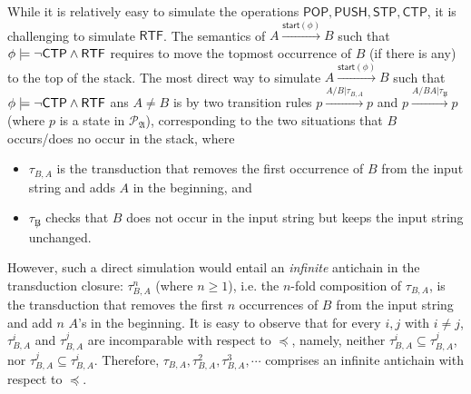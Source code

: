 \documentclass[preprint,12pt]{elsarticle}
\newcommand\Mm{{\mathcal{M} }}
\newcommand\Pp{{\mathcal{P} }}
\newcommand\ctpflag{{\sf CTP}}
\newcommand\rtfflag{{\sf RTF}}
\newcommand\startactivity{{\mathsf{start} }}
\newcommand{\PUSH}{\mathsf{PUSH}}
\newcommand{\CTP}{\mathsf{CTP}}
\newcommand{\RTF}{\mathsf{RTF}}
\newcommand{\POP}{\mathsf{POP}}
\newcommand{\STP}{\mathsf{STP}}
\newcommand\Aut{{\mathfrak{A} }}
\newcommand{\WOTrPDS}{\textsf{WPOTrPDS}}
\begin{document}
While it is relatively easy to simulate the operations $\POP, \PUSH, \STP, \CTP$, %
it is challenging to  simulate $\RTF$. The semantics of $A \xrightarrow{\startactivity(\phi)}B$ such that $\phi \models \neg \ctpflag \wedge \rtfflag$ requires to move the topmost occurrence of $B$ (if there is any) to the top of the stack. The most direct way to simulate  $A \xrightarrow{\startactivity(\phi)}B$ such that $\phi \models \neg \ctpflag \wedge \rtfflag$ ans $A \neq B$ is by two transition rules $p \xrightarrow{A / B | \tau_{B, A}} p$ and  $p \xrightarrow{A / BA | \tau_{\not B}} p$
(where $p$ is a state in $\Pp_\Aut$), corresponding to the two situations that $B$ occurs/does no occur in the stack, where 
\begin{itemize}
\item $\tau_{B, A}$ is the transduction that removes the first occurrence of $B$ from the input string and adds $A$ in the beginning, and
%
\item $\tau_{\not B}$ checks that $B$ does not occur in the input string but keeps the input string unchanged. 
\end{itemize}


However, such a direct simulation would entail an \emph{infinite} antichain in the transduction closure: $\tau^n_{B, A}$  (where $n \ge 1$), i.e. the $n$-fold composition of $\tau_{B,A}$, is the transduction that removes the first $n$ occurrences of $B$ from the input string and add $n$ $A$'s in the beginning. It is easy to observe that for every $i, j$ with $i \neq j$, $\tau^i_{B, A}$ and $\tau^j_{B, A}$ are incomparable with respect to $\preceq$, namely, neither $\tau^i_{B, A} \subseteq \tau^j_{B, A}$, nor $\tau^j_{B, A} \subseteq \tau^i_{B, A}$. Therefore, $\tau_{B, A}, \tau^2_{B, A}, \tau^3_{B, A}, \cdots$ comprises an infinite antichain with respect to $\preceq$. 
\end{document}
